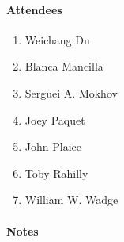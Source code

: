 \documentclass{easychair}
\begin{document}
\paragraph{Attendees}

\begin{enumerate}
	\item Weichang Du
	\item Blanca Mancilla
	\item Serguei A. Mokhov
	\item Joey Paquet
	\item John Plaice
	\item Toby Rahilly
	\item William W. Wadge
\end{enumerate}

\paragraph{Notes}
\end{document}
